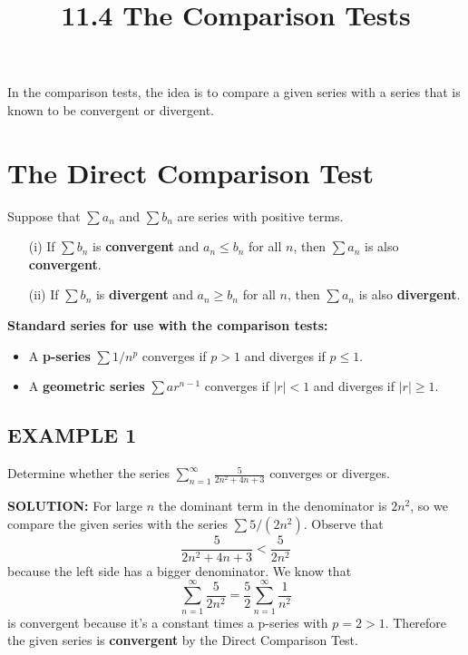 \documentclass{article}
\title{11.4 The Comparison Tests}
\date{}
\author{}
\begin{document}
\maketitle

In the comparison tests, the idea is to compare a given series with a series that is known to be convergent or divergent.

\section*{The Direct Comparison Test}

\begin{tcolorbox}[
    colback=white,
    colframe=orange!80!white,
    title=The Direct Comparison Test,
    boxrule=0.5mm,
    arc=3mm
    ]
    Suppose that \( \sum a_n \) and \( \sum b_n \) are series with positive terms.
    \begin{itemize}
        \item[(i)] If \( \sum b_n \) is \textbf{convergent} and \( a_n \le b_n \) for all \( n \), then \( \sum a_n \) is also \textbf{convergent}.
        \item[(ii)] If \( \sum b_n \) is \textbf{divergent} and \( a_n \ge b_n \) for all \( n \), then \( \sum a_n \) is also \textbf{divergent}.
    \end{itemize}
    \textbf{Standard series for use with the comparison tests:}
    \begin{itemize}
        \item A \textbf{p-series} \( \sum 1/n^p \) converges if \( p > 1 \) and diverges if \( p \le 1 \).
        \item A \textbf{geometric series} \( \sum ar^{n-1} \) converges if \( |r| < 1 \) and diverges if \( |r| \ge 1 \).
    \end{itemize}
\end{tcolorbox}

\subsection*{EXAMPLE 1}
Determine whether the series \( \sum_{n=1}^{\infty} \frac{5}{2n^2 + 4n + 3} \) converges or diverges.

\textbf{SOLUTION:}
For large $n$ the dominant term in the denominator is $2n^2$, so we compare the given series with the series $\sum 5/(2n^2)$. Observe that
\[ \frac{5}{2n^2 + 4n + 3} < \frac{5}{2n^2} \]
because the left side has a bigger denominator. We know that
\[ \sum_{n=1}^{\infty} \frac{5}{2n^2} = \frac{5}{2} \sum_{n=1}^{\infty} \frac{1}{n^2} \]
is convergent because it's a constant times a p-series with $p = 2 > 1$. Therefore the given series is \textbf{convergent} by the Direct Comparison Test.
\end{document}
